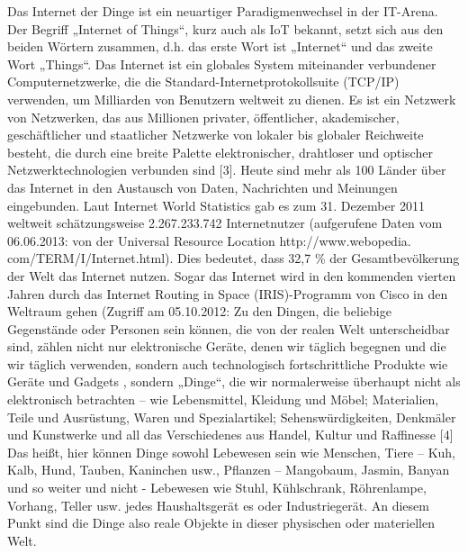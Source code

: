     Das Internet der Dinge ist ein neuartiger Paradigmenwechsel in der IT-Arena. Der Begriff „Internet of Things“, 
    kurz auch als IoT bekannt, setzt sich aus den beiden Wörtern zusammen, d.h. das erste Wort ist „Internet“ und das 
    zweite Wort „Things“. Das Internet ist ein globales System miteinander verbundener Computernetzwerke, die die 
    Standard-Internetprotokollsuite (TCP/IP) verwenden, um Milliarden von Benutzern weltweit zu dienen. Es ist ein 
    Netzwerk von Netzwerken, das aus Millionen privater, öffentlicher, akademischer, geschäftlicher und staatlicher 
    Netzwerke von lokaler bis globaler Reichweite besteht, die durch eine breite Palette elektronischer, drahtloser 
    und optischer Netzwerktechnologien verbunden sind [3]. Heute sind mehr als 100 Länder über das Internet in den 
    Austausch von Daten, Nachrichten und Meinungen eingebunden. Laut Internet World Statistics gab es zum 
    31. Dezember 2011 weltweit schätzungsweise 2.267.233.742 Internetnutzer (aufgerufene Daten vom 06.06.2013: 
    von der Universal Resource Location http://www.webopedia. com/TERM/I/Internet.html). Dies bedeutet, dass 32,7 \% 
    der Gesamtbevölkerung der Welt das Internet nutzen. Sogar das Internet wird in den kommenden vierten Jahren durch 
    das Internet Routing in Space (IRIS)-Programm von Cisco in den Weltraum gehen (Zugriff am 05.10.2012: 
    Zu den Dingen, die beliebige Gegenstände oder Personen sein können, die von der realen Welt unterscheidbar sind, 
    zählen nicht nur elektronische Geräte, denen wir täglich begegnen und die wir täglich verwenden, sondern auch 
    technologisch fortschrittliche Produkte wie Geräte und Gadgets , sondern „Dinge“, die wir normalerweise überhaupt 
    nicht als elektronisch betrachten – wie Lebensmittel, Kleidung und Möbel; Materialien, Teile und Ausrüstung, Waren 
    und Spezialartikel; Sehenswürdigkeiten, Denkmäler und Kunstwerke und all das Verschiedenes aus Handel, Kultur und 
    Raffinesse [4] Das heißt, hier können Dinge sowohl Lebewesen sein wie Menschen, Tiere – Kuh, Kalb, Hund, Tauben, 
    Kaninchen usw., Pflanzen – Mangobaum, Jasmin, Banyan und so weiter und nicht - Lebewesen wie Stuhl, Kühlschrank, 
    Röhrenlampe, Vorhang, Teller usw. jedes Haushaltsgerät es oder Industriegerät. An diesem Punkt sind die Dinge also 
    reale Objekte in dieser physischen oder materiellen Welt.

